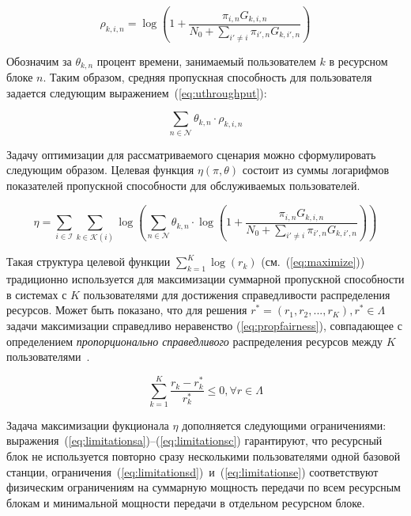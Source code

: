 \begin{equation}
    \label{eq:throughput}
    \rho_{k,i,n} = \log \left(1 + \frac{\pi_{i,n} G_{k,i,n}}{N_0 + \sum_{i'\neq i}{\pi_{i',n} G_{k,i',n}}}\right)
\end{equation}

Обозначим за $\theta_{k,n}$ процент времени, занимаемый пользователем $k$ в ресурсном блоке $n$. Таким образом, средняя пропускная способность для пользователя задается следующим выражением~(\ref{eq:uthroughput}):

\begin{equation}
    \label{eq:uthroughput}
    \sum_{n \in \mathcal{N}} \theta_{k,n} \cdot \rho_{k,i,n}
\end{equation}

Задачу оптимизации для рассматриваемого сценария можно сформулировать следующим образом. Целевая функция $\eta(\pi, \theta)$ состоит из суммы логарифмов показателей пропускной способности для обслуживаемых пользователей.

\begin{equation}
\label{eq:maximize}
\eta = \sum_{i \in \mathcal{I}} \sum_{k \in \mathcal{K}(i)} \log \left(\sum_{n \in \mathcal{N}} \theta_{k,n} \cdot \log \left(1 + \frac{\pi_{i,n} G_{k,i,n}}{N_0 + \sum_{i'\neq i}{\pi_{i',n} G_{k,i',n}}}\right)\right) 
\end{equation}

Такая структура целевой функции $\sum_{k=1}^K \log(r_k)$ (см.~(\ref{eq:maximize})) традиционно используется для максимизации суммарной пропускной способности в системах с $K$ пользователями для достижения справедливости распределения ресурсов. Может быть показано, что для решения $r^* = (r_1,r_2,...,r_K), r^* \in \Lambda$ задачи максимизации справедливо  неравенство (\ref{eq:propfairness}),  совпадающее с определением \textit{пропорционально справедливого} распределения ресурсов между $K$ пользователями~\cite{ETT:ETT4460080106}.

\begin{equation}
\label{eq:propfairness}
\sum_{k=1}^K \frac{r_k - r_k^*}{r_k^*} \leq 0, \forall r \in \Lambda
\end{equation}

Задача максимизации фукционала $\eta$ дополняется следующими ограничениями: выражения~(\ref{eq:limitationsa})--(\ref{eq:limitationsc}) гарантируют, что ресурсный блок не используется повторно сразу несколькими пользователями одной базовой станции,  ограничения~(\ref{eq:limitationsd})~и~(\ref{eq:limitationse}) соответствуют физическим ограничениям на суммарную мощность передачи по всем ресурсным блокам и минимальной мощности передачи в отдельном ресурсном блоке.

